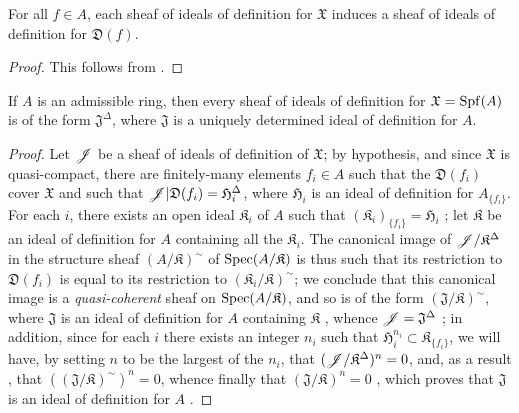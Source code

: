 \begin{proposition}[10.3.4]
\label{1.10.3.4}
For all $f\in A$, each sheaf of ideals of definition for $\mathfrak{X}$ induces a sheaf of ideals of definition for $\mathfrak{D}(f)$.
\end{proposition}

\begin{proof}
\label{proof-1.10.3.4}
This follows from .
\end{proof}

\begin{proposition}[10.3.5]
\label{1.10.3.5}
If $A$ is an admissible ring, then every sheaf of ideals of definition for $\mathfrak{X}=\operatorname{Spf}(A)$ is of the form $\mathfrak{J}^\Delta$, where $\mathfrak{J}$ is a uniquely determined ideal of definition for $A$.
\end{proposition}

\begin{proof}
\label{proof-1.10.3.5}
Let $\mathscr{J}$ be a sheaf of ideals of definition of $\mathfrak{X}$; by hypothesis, and since $\mathfrak{X}$ is quasi-compact, there are finitely-many elements $f_i\in A$ such that the $\mathfrak{D}(f_i)$ cover $\mathfrak{X}$ and such that $\mathscr{J}|\mathfrak{D}(f_i)=\mathfrak{H}_i^\Delta$, where $\mathfrak{H}_i$ is an ideal of definition for $A_{\{f_i\}}$.
For each $i$, there exists an open ideal $\mathfrak{K}_i$ of $A$ such that $(\mathfrak{K}_i)_{\{f_i\}}=\mathfrak{H}_i$ ; let $\mathfrak{K}$ be an ideal of definition for $A$ containing all the $\mathfrak{K}_i$.
The canonical image of $\mathscr{J}/\mathfrak{K}^\Delta$ in the structure sheaf $(A/\mathfrak{K})^\sim$ of $\operatorname{Spec}(A/\mathfrak{K})$  is thus such that its restriction to $\mathfrak{D}(f_i)$ is equal to its restriction to $(\mathfrak{K}_i/\mathfrak{K})^\sim$;
we conclude that this canonical image is a \emph{quasi-coherent} sheaf on $\operatorname{Spec}(A/\mathfrak{K})$, and so is of the form $(\mathfrak{J}/\mathfrak{K})^\sim$, where $\mathfrak{J}$ is an ideal of definition for $A$ containing $\mathfrak{K}$ , whence $\mathscr{J}=\mathfrak{J}^\Delta$ ;
in addition, since for each $i$ there exists an integer $n_i$ such that $\mathfrak{H}_i^{n_i}\subset\mathfrak{K}_{\{f_i\}}$, we will have, by setting $n$ to be the largest of the $n_i$, that $(\mathscr{J}/\mathfrak{K}^\Delta)^n=0$, and, as a result , that $((\mathfrak{J}/\mathfrak{K})^\sim)^n=0$, whence finally that $(\mathfrak{J}/\mathfrak{K})^n=0$ , which proves that $\mathfrak{J}$ is an ideal of definition for $A$ .
\end{proof}


